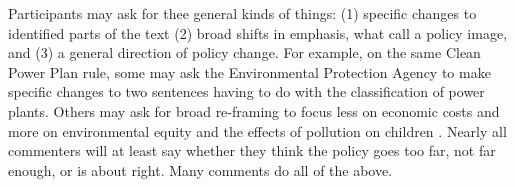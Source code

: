 




Participants may ask for thee general kinds of things: (1) specific changes to identified parts of the text (2) broad shifts in emphasis, what \citet{Jones2005} call a policy image, and (3) a general direction of policy change. For example, on the same Clean Power Plan rule, some may ask the Environmental Protection Agency to make specific changes to two sentences having to do with the classification of power plants. %
Others may ask for broad re-framing to focus less on economic costs and more on environmental equity and the effects of pollution on children \citep{Rinfret2011}.
Nearly all commenters will at least say whether they think the policy goes too far, not far enough, or is about right. Many comments do all of the above. 

